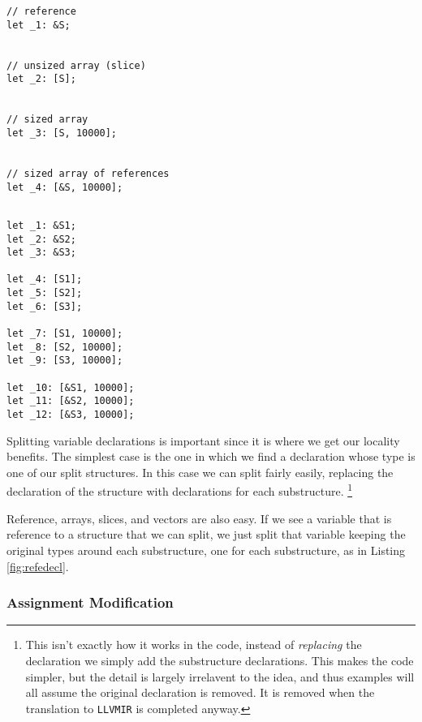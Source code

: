 \documentclass[prodmode,acmtecs]{acmsmall} %
\newcommand{\llvmirname}{{\texttt{LLVMIR}}}
\def \llvmir {\llvmirname{}\xspace}
\begin{document}
\label{sec:splitting}
\begin{figure*}
  \begin{minipage}[t]{0.5\linewidth}
    \begin{verbatim}
// reference
let _1: &S;


// unsized array (slice)
let _2: [S];


// sized array
let _3: [S, 10000];


// sized array of references
let _4: [&S, 10000];


\end{verbatim}
\end{minipage}
\begin{minipage}[t]{0.5\linewidth}
\begin{verbatim}
let _1: &S1;
let _2: &S2;
let _3: &S3;

let _4: [S1];
let _5: [S2];
let _6: [S3];

let _7: [S1, 10000];
let _8: [S2, 10000];
let _9: [S3, 10000];

let _10: [&S1, 10000];
let _11: [&S2, 10000];
let _12: [&S3, 10000];
\end{verbatim}
\end{minipage}


  \caption{Reference and Array Splitting $g = 3$}
  \label{fig:refedecl}
\end{figure*}
Splitting variable declarations is important since it is where
we get our locality benefits.  The simplest case is the one in which
we find a declaration whose type is one of our split structures. In this 
case we can split fairly easily, replacing the declaration of the structure with
declarations for each substructure.  
\footnote{This isn't exactly how it works in the code, instead of 
  \textit{replacing} the declaration we simply add the 
  substructure declarations.  This makes the code simpler, 
  but the detail is largely irrelavent to the
  idea, and thus examples will all assume the original declaration is removed.
  It is removed when the translation to \llvmir is completed anyway.}

Reference, arrays, slices, and vectors are also easy. 
If we see a variable that is reference to a structure 
that we can split, we just split that variable keeping the original
types around each substructure, 
one for each substructure, as in Listing \ref{fig:refedecl}.

\subsubsection{Assignment Modification}
\label{sec:assign}
\end{document}
